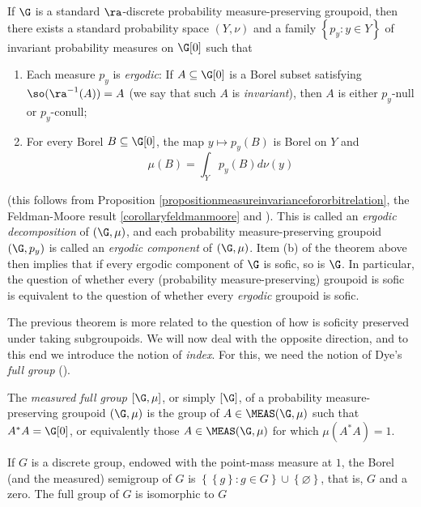If $\G$ is a standard $\ra$-discrete probability measure-preserving groupoid, then there exists a standard probability space $(Y,\nu)$ and a family $\left\{p_y:y\in Y\right\}$ of invariant probability measures on $\G[0]$ such that
\begin{enumerate}
\item[(i)] Each measure $p_y$ is \emph{ergodic}: If $A\subseteq\G[0]$ is a Borel subset satisfying $\so(\ra^{-1}(A))=A$ (we say that such $A$ is \emph{invariant}), then $A$ is either $p_y$-null or $p_y$-conull;
\item[(ii)] For every Borel $B\subseteq\G[0]$, the map $y\mapsto p_y(B)$ is Borel on $Y$ and
\[\mu(B)=\int_Y p_y(B)d\nu(y)\]
\end{enumerate}
(this follows from Proposition \ref{propositionmeasureinvariancefororbitrelation}, the Feldman-Moore result \ref{corollaryfeldmanmoore} and \cite[Theorem 1.1]{MR1784210}). This is called an \emph{ergodic decomposition} of $(\G,\mu)$, and each probability measure-preserving groupoid $(\G,p_y)$ is called an \emph{ergodic component} of $(\G,\mu)$. Item (b) of the theorem above then implies that if every ergodic component of $\G$ is sofic, so is $\G$. In particular, the question of whether every (probability measure-preserving) groupoid is sofic is equivalent to the question of whether every \emph{ergodic} groupoid is sofic.

The previous theorem is more related to the question of how is soficity preserved under taking subgroupoids. We will now deal with the opposite direction, and to this end we introduce the notion of \emph{index}. For this, we need the notion of Dye's \emph{full group} (\cite{MR0131516}).

\begin{definition}
The \emph{measured full group} $[\G,\mu]$, or simply $[\G]$, of a probability measure-preserving groupoid $(\G,\mu)$ is the group of $A\in\MEAS(\G,\mu)$ such that $A^*A=\G[0]$, or equivalently those $A\in\MEAS(\G,\mu)$ for which $\mu(A^*A)=1$.
\end{definition}

\begin{example}
If $G$ is a discrete group, endowed with the point-mass measure at $1$, the Borel (and the measured) semigroup of $G$ is $\left\{\left\{g\right\}:g\in G\right\}\cup\left\{\varnothing\right\}$, that is, $G$ and a zero. The full group of $G$ is isomorphic to $G$
\end{example}

